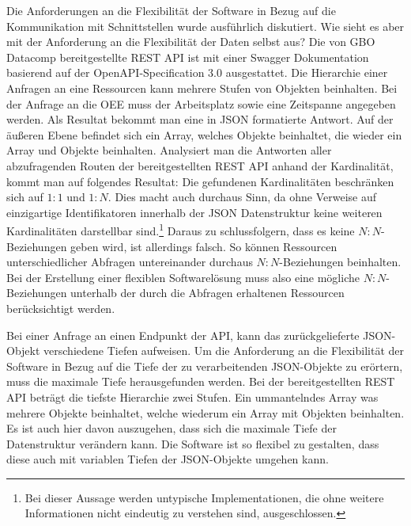 Die Anforderungen an die Flexibilität der Software in Bezug auf die Kommunikation mit Schnittstellen wurde
ausführlich diskutiert. Wie sieht es aber mit der Anforderung an die Flexibilität der Daten selbst aus?
Die von GBO Datacomp bereitgestellte REST API ist mit einer Swagger Dokumentation basierend auf der
OpenAPI-Specification 3.0 ausgestattet. Die Hierarchie einer Anfragen an eine Ressourcen kann mehrere Stufen von Objekten beinhalten.
Bei der Anfrage an die OEE muss der Arbeitsplatz sowie eine Zeitspanne angegeben werden. Als Resultat bekommt man eine 
in JSON formatierte Antwort. Auf der äußeren Ebene befindet sich ein Array, welches Objekte beinhaltet, die wieder ein
Array und Objekte beinhalten. Analysiert man die Antworten aller abzufragenden Routen der bereitgestellten REST API anhand der Kardinalität,
kommt man auf folgendes Resultat: Die gefundenen Kardinalitäten beschränken sich auf \(1:1\) und \(1:N\). Dies macht auch
durchaus Sinn, da ohne Verweise auf einzigartige Identifikatoren innerhalb der JSON Datenstruktur keine weiteren
Kardinalitäten darstellbar sind.\footnote{Bei dieser Aussage werden untypische Implementationen, die ohne weitere Informationen nicht eindeutig zu verstehen sind, ausgeschlossen.}
Daraus zu schlussfolgern, dass es keine \(N:N\)-Beziehungen geben wird, ist allerdings falsch.
So können Ressourcen unterschiedlicher Abfragen untereinander durchaus \(N:N\)-Beziehungen beinhalten. Bei der Erstellung
einer flexiblen Softwarelösung muss also eine mögliche \(N:N\)-Beziehungen unterhalb der durch die Abfragen erhaltenen
Ressourcen berücksichtigt werden.

Bei einer Anfrage an einen Endpunkt der API, kann das zurückgelieferte JSON-Objekt verschiedene Tiefen aufweisen. 
Um die Anforderung an die Flexibilität der Software in Bezug auf die Tiefe der zu verarbeitenden JSON-Objekte zu
erörtern, muss die maximale Tiefe herausgefunden werden. Bei der bereitgestellten REST API beträgt die tiefste
Hierarchie zwei Stufen. Ein ummantelndes Array was mehrere Objekte beinhaltet, welche wiederum ein Array mit Objekten
beinhalten. Es ist auch hier davon auszugehen, dass sich die maximale Tiefe der Datenstruktur verändern kann.
Die Software ist so flexibel zu gestalten, dass diese auch mit variablen Tiefen der JSON-Objekte umgehen kann.

